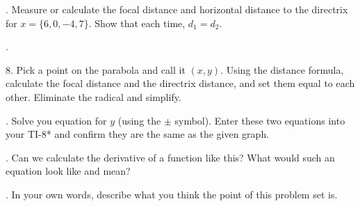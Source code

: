 \begin{multicols*}{2}
. Measure or calculate the focal distance and horizontal distance to the
directrix for $x=\{6,0,-4,7\}$.  Show that each time, $d_1=d_2$.

\vspace{3cm}
\noindent.

8. Pick a point on the parabola and call it $(x,y)$.  Using the distance
formula, calculate the focal distance and the directrix distance, and
set them equal to each other.  Eliminate the radical and simplify.

\vspace{3cm}
. Solve you equation for $y$ (using the $\pm$ symbol).  Enter these
two equations into your TI-8* and confirm they are the same as the
given graph.

\vspace{0.5cm}
.  Can we calculate the derivative of a function like this?  What would
such an equation look like and mean?

\vspace{2cm}
.  In your own words, describe what you think the point of this
problem set is.
\end{multicols*}
